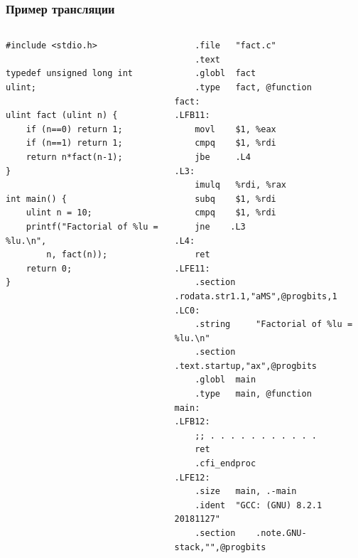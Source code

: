\documentclass[10pt]{beamer}
\begin{document}
\begin{frame}[fragile]
  \frametitle{Пример трансляции}
   \begin{columns}
     \begin{column}{0.5\textwidth}
 \begin{verbatim}
#include <stdio.h>

typedef unsigned long int ulint;

ulint fact (ulint n) {
    if (n==0) return 1;
    if (n==1) return 1;
    return n*fact(n-1);
}

int main() {
    ulint n = 10;
    printf("Factorial of %lu = %lu.\n",
        n, fact(n));
    return 0;
}
 \end{verbatim}
     \end{column}
      \begin{column}{0.5\textwidth}
\begin{verbatim}
	.file   "fact.c"
	.text
	.globl  fact
	.type   fact, @function
fact:
.LFB11:
	movl    $1, %eax
	cmpq    $1, %rdi
	jbe     .L4
.L3:
	imulq   %rdi, %rax
	subq    $1, %rdi
	cmpq    $1, %rdi
	jne    .L3
.L4:
	ret
.LFE11:
	.section    .rodata.str1.1,"aMS",@progbits,1
.LC0:
	.string     "Factorial of %lu = %lu.\n"
	.section    .text.startup,"ax",@progbits
	.globl  main
	.type   main, @function
main:
.LFB12:
	;; . . . . . . . . . . .
	ret
	.cfi_endproc
.LFE12:
	.size   main, .-main
	.ident  "GCC: (GNU) 8.2.1 20181127"
	.section    .note.GNU-stack,"",@progbits
\end{verbatim}
      \end{column}
    \end{columns}
 \end{frame}
\end{document}
